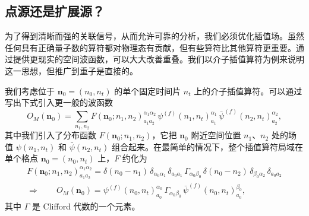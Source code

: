 \subsection{点源还是扩展源？}

为了得到清晰而强的关联信号，从而允许可靠的分析，我们必须优化插值场。虽然任何具有正确量子数的算符都对物理态有贡献，但有些算符比其他算符更重要。通过提供更现实的空间波函数，可以大大改善重叠。我们以介子插值算符为例来说明这一思想，但推广到重子是直接的。

我们考虑位于 $\mathbf{n}_0 = (n_0, n_t)$ 的单个固定时间片 $n_t$ 上的介子插值算符。可以通过写出下式引入更一般的波函数
\begin{equation}
  O_M(\mathbf{n}_0) = \sum_{n_1,n_2}
    F(\mathbf{n}_0; n_1, n_2)^{\alpha_1\alpha_2}_{a_1a_2}\,
    \psi^{(f)}(n_1, n_t)^{\alpha_1}_{a_1}\,
    \bar\psi^{(f)}(n_2, n_t)^{\alpha_2}_{a_2} ,
\end{equation}
其中我们引入了分布函数 $F(\mathbf{n}_0; n_1, n_2)$，它把 $\mathbf{n}_0$ 附近空间位置 $n_1$、$n_2$ 处的场值 $\psi(n_1, n_t)$ 和 $\bar\psi(n_2, n_t)$ 组合起来。在最简单的情况下，整个插值算符局域在单个格点 $\mathbf{n}_0 = (n_0, n_t)$ 上，$F$ 约化为
\begin{equation}
  \begin{gathered}
    F(\mathbf{n}_0; n_1, n_2)^{\alpha_1\alpha_2}_{a_1a_2}
    = \delta(n_0 - n_1)\, \delta_{\alpha_0\alpha_1}\, \delta_{a_0a_1}\,
      \Gamma_{\alpha_0\beta_0}\, \delta(n_0 - n_2)\, \delta_{\beta_0\alpha_2}\,
      \delta_{a_0a_2} \\[2mm]
    \Longrightarrow\qquad
    O_M(\mathbf{n}_0) = \psi^{(f)}(n_0, n_t)^{\alpha_0}_{a_0}\,
      \Gamma_{\alpha_0\beta_0}\, \bar\psi^{(f)}(n_0, n_t)^{\beta_0}_{a_0} ,
  \end{gathered}
\end{equation}
其中 $\Gamma$ 是 Clifford 代数的一个元素。

